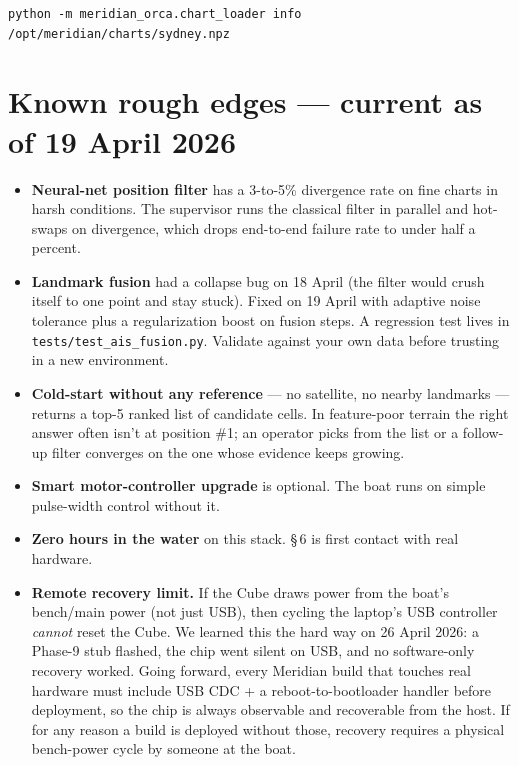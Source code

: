 \documentclass[10pt,a4paper]{article}
\begin{document}
\begin{stepbox}
\begin{lstlisting}
python -m meridian_orca.chart_loader info /opt/meridian/charts/sydney.npz
\end{lstlisting}
\end{stepbox}

\section{Known rough edges --- current as of 19 April 2026}
\begin{itemize}
\item \textbf{Neural-net position filter} has a 3-to-5\% divergence rate on fine charts in harsh conditions. The supervisor runs the classical filter in parallel and hot-swaps on divergence, which drops end-to-end failure rate to under half a percent.
\item \textbf{Landmark fusion} had a collapse bug on 18 April (the filter would crush itself to one point and stay stuck). Fixed on 19 April with adaptive noise tolerance plus a regularization boost on fusion steps. A regression test lives in \texttt{tests/test\_ais\_fusion.py}. Validate against your own data before trusting in a new environment.
\item \textbf{Cold-start without any reference} --- no satellite, no nearby landmarks --- returns a top-5 ranked list of candidate cells. In feature-poor terrain the right answer often isn't at position \#1; an operator picks from the list or a follow-up filter converges on the one whose evidence keeps growing.
\item \textbf{Smart motor-controller upgrade} is optional. The boat runs on simple pulse-width control without it.
\item \textbf{Zero hours in the water} on this stack. §\,6 is first contact with real hardware.
\item \textbf{Remote recovery limit.} If the Cube draws power from the boat's bench/main power (not just USB), then cycling the laptop's USB controller \emph{cannot} reset the Cube. We learned this the hard way on 26 April 2026: a Phase-9 stub flashed, the chip went silent on USB, and no software-only recovery worked. Going forward, every Meridian build that touches real hardware must include USB CDC + a reboot-to-bootloader handler before deployment, so the chip is always observable and recoverable from the host. If for any reason a build is deployed without those, recovery requires a physical bench-power cycle by someone at the boat.
\end{itemize}
\end{document}
